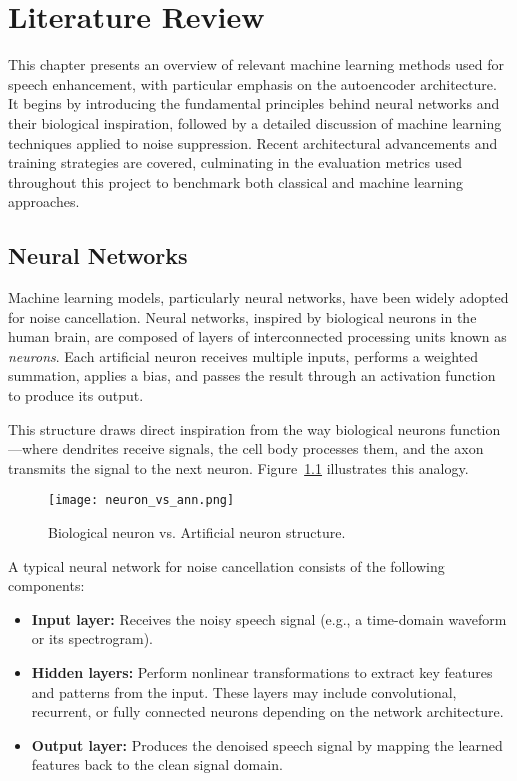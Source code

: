 \graphicspath{{content/chapters/3_literature/figures/}}
\chapter{Literature Review}
\label{sec:literature_review}

This chapter presents an overview of relevant machine learning methods used for speech enhancement, with particular emphasis on the autoencoder architecture. It begins by introducing the fundamental principles behind neural networks and their biological inspiration, followed by a detailed discussion of machine learning techniques applied to noise suppression. Recent architectural advancements and training strategies are covered, culminating in the evaluation metrics used throughout this project to benchmark both classical and machine learning approaches.


\section{Neural Networks}
\label{sec:neural_networks}

Machine learning models, particularly neural networks, have been widely adopted for noise cancellation. Neural networks, inspired by biological neurons in the human brain, are composed of layers of interconnected processing units known as \textit{neurons}. Each artificial neuron receives multiple inputs, performs a weighted summation, applies a bias, and passes the result through an activation function to produce its output.

This structure draws direct inspiration from the way biological neurons function—where dendrites receive signals, the cell body processes them, and the axon transmits the signal to the next neuron. Figure~\ref{fig:neuron_vs_ann} illustrates this analogy.

\begin{figure}[H]
    \centering
    \texttt{[image: neuron\_vs\_ann.png]}
    \caption{Biological neuron vs. Artificial neuron structure.\cite{ghosh2020perceptron}}
    \label{fig:neuron_vs_ann}
\end{figure}

A typical neural network for noise cancellation consists of the following components:
\begin{itemize}
    \item \textbf{Input layer:} Receives the noisy speech signal (e.g., a time-domain waveform or its spectrogram).
    \item \textbf{Hidden layers:} Perform nonlinear transformations to extract key features and patterns from the input. These layers may include convolutional, recurrent, or fully connected neurons depending on the network architecture.
    \item \textbf{Output layer:} Produces the denoised speech signal by mapping the learned features back to the clean signal domain.
\end{itemize}

